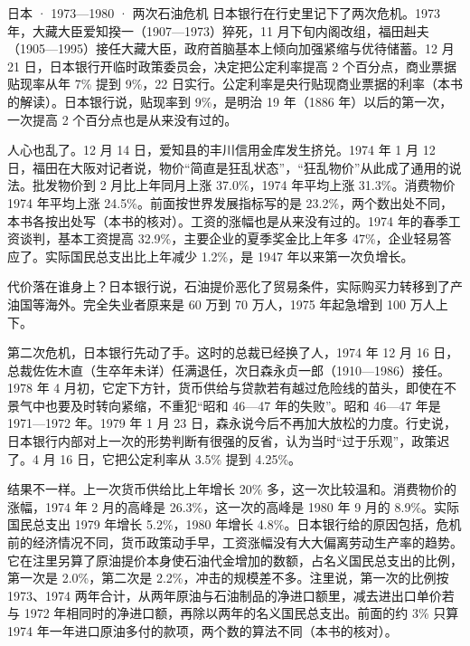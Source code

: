 \begin{case}{日本 · 1973—1980 · 两次石油危机}
日本银行在行史里记下了两次危机。1973 年，大藏大臣爱知揆一（1907—1973）猝死，11 月下旬内阁改组，福田赳夫（1905—1995）接任大藏大臣，政府首脑基本上倾向加强紧缩与优待储蓄\cite{boj1986,loc47}。12 月 21 日，日本银行开临时政策委员会，决定把公定利率提高 2 个百分点，商业票据贴现率从年 7\% 提到 9\%，22 日实行\cite{boj1986}。公定利率是央行贴现商业票据的利率（本书的解读）。日本银行说，贴现率到 9\%，是明治 19 年（1886 年）以后的第一次，一次提高 2 个百分点也是从来没有过的\cite{boj1986}。

人心也乱了。12 月 14 日，爱知县的丰川信用金库发生挤兑\cite{boj1986}。1974 年 1 月 12 日，福田在大阪对记者说，物价“简直是狂乱状态”，“狂乱物价”从此成了通用的说法\cite{boj1986}。批发物价到 2 月比上年同月上涨 37.0\%，1974 年平均上涨 31.3\%\cite{boj1986}。消费物价 1974 年平均上涨 24.5\%\cite{boj1986}。前面按世界发展指标写的是 23.2\%，两个数出处不同，本书各按出处写（本书的核对）。工资的涨幅也是从来没有过的\cite{boj1986}。1974 年的春季工资谈判，基本工资提高 32.9\%，主要企业的夏季奖金比上年多 47\%，企业轻易答应了\cite{boj1986}。实际国民总支出比上年减少 1.2\%，是 1947 年以来第一次负增长\cite{boj1986}。

代价落在谁身上？日本银行说，石油提价恶化了贸易条件，实际购买力转移到了产油国等海外\cite{boj1986}。完全失业者原来是 60 万到 70 万人，1975 年起急增到 100 万人上下\cite{boj1986}。

第二次危机，日本银行先动了手。这时的总裁已经换了人，1974 年 12 月 16 日，总裁佐佐木直（生卒年未详）任满退任，次日森永贞一郎（1910—1986）接任\cite{boj1986,loc47}。1978 年 4 月初，它定下方针，货币供给与贷款若有越过危险线的苗头，即使在不景气中也要及时转向紧缩，不重犯“昭和 46—47 年的失败”\cite{boj1986}。昭和 46—47 年是 1971—1972 年。1979 年 1 月 23 日，森永说今后不再加大放松的力度\cite{boj1986}。行史说，日本银行内部对上一次的形势判断有很强的反省，认为当时“过于乐观”，政策迟了\cite{boj1986}。4 月 16 日，它把公定利率从 3.5\% 提到 4.25\%\cite{boj1986}。

结果不一样。上一次货币供给比上年增长 20\% 多，这一次比较温和\cite{boj1986}。消费物价的涨幅，1974 年 2 月的高峰是 26.3\%，这一次的高峰是 1980 年 9 月的 8.9\%\cite{boj1986}。实际国民总支出 1979 年增长 5.2\%，1980 年增长 4.8\%\cite{boj1986}。日本银行给的原因包括，危机前的经济情况不同，货币政策动手早，工资涨幅没有大大偏离劳动生产率的趋势\cite{boj1986}。它在注里另算了原油提价本身使石油代金增加的数额，占名义国民总支出的比例，第一次是 2.0\%，第二次是 2.2\%，冲击的规模差不多\cite{boj1986}。注里说，第一次的比例按 1973、1974 两年合计，从两年原油与石油制品的净进口额里，减去进出口单价若与 1972 年相同时的净进口额，再除以两年的名义国民总支出\cite{boj1986}。前面的约 3\% 只算 1974 年一年进口原油多付的款项，两个数的算法不同（本书的核对）。
\end{case}

